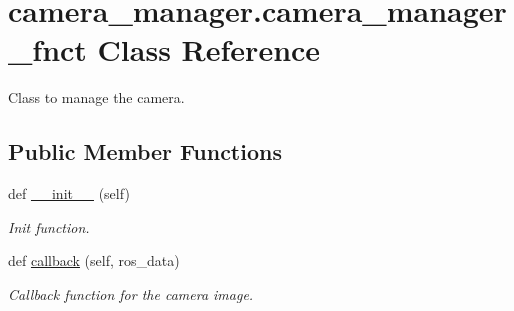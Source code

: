 \hypertarget{classcamera__manager_1_1camera__manager__fnct}{}\section{camera\+\_\+manager.\+camera\+\_\+manager\+\_\+fnct Class Reference}
\label{classcamera__manager_1_1camera__manager__fnct}


Class to manage the camera.  


\subsection*{Public Member Functions}
\begin{DoxyCompactItemize}
\item 
def \hyperlink{classcamera__manager_1_1camera__manager__fnct_a944308d26d8a0f09819f7b3d42efd481}{\+\_\+\+\_\+init\+\_\+\+\_\+} (self)\hypertarget{classcamera__manager_1_1camera__manager__fnct_a944308d26d8a0f09819f7b3d42efd481}{}\label{classcamera__manager_1_1camera__manager__fnct_a944308d26d8a0f09819f7b3d42efd481}

\begin{DoxyCompactList}\small\item\em Init function. \end{DoxyCompactList}\item 
def \hyperlink{classcamera__manager_1_1camera__manager__fnct_a02a790713c211f2e5d1c0026c585c536}{callback} (self, ros\+\_\+data)\hypertarget{classcamera__manager_1_1camera__manager__fnct_a02a790713c211f2e5d1c0026c585c536}{}\label{classcamera__manager_1_1camera__manager__fnct_a02a790713c211f2e5d1c0026c585c536}

\begin{DoxyCompactList}\small\item\em Callback function for the camera image. \end{DoxyCompactList}\end{DoxyCompactItemize}
